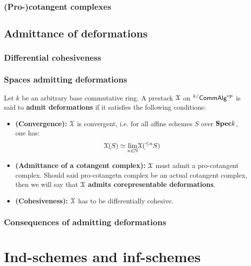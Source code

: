             \subsubsection{(Pro-)cotangent complexes}
        
        \subsection{Admittance of deformations}
            \subsubsection{Differential cohesiveness}
        
            \subsubsection{Spaces admitting deformations}
                \begin{definition} \label{def: prestacks_admitting_deformations}
                    Let $k$ be an arbitrary base commutative ring. A prestack $\mathcal{X}$ on ${}^{k/}\mathsf{Comm}\mathsf{Alg}^{\mathrm{op}}$ is said to \textbf{admit deformations} if it satisfies the following conditions:
                        \begin{itemize}
                            \item \textbf{(Convergence):} $\mathcal{X}$ is convergent, i.e. for all affine schemes $S$ over $\mathbf{Spec} k$, one has:
                                $$\mathcal{X}(S) \simeq \underset{n \in \mathbb{N}}{\operatorname{lim}} \mathcal{X}({}^{\leq n}S)$$
                            \item \textbf{(Admittance of a cotangent complex):} $\mathcal{X}$ must admit a pro-cotangent complex. Should said pro-cotangetn complex be an actual cotangent complex, then we will say that $\mathcal{X}$ \textbf{admits corepresentable deformations}.
                            \item \textbf{(Cohesiveness):} $\mathcal{X}$ has to be differentially cohesive.
                        \end{itemize}
                \end{definition}
            
            \subsubsection{Consequences of admitting deformations}
            
    \section{Ind-schemes and inf-schemes}
